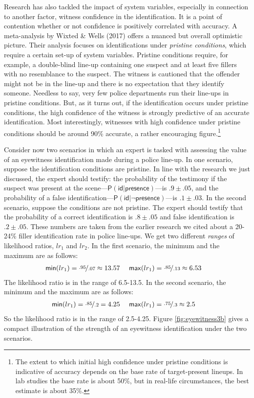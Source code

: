 \documentclass[
  10pt,
  dvipsnames,enabledeprecatedfontcommands]{scrartcl}
\newcommand{\raf}[1]{\todo[color=olive!40]{#1}}
\newcommand{\pr}[1]{\mathsf{P}(#1)}
\begin{document}
Research has also tackled the impact of system variables, especially in
connection to another factor, witness confidence in the identification.
It is a point of contention whether or not confidence is positively
correlated with accuracy. A meta-analysis by Wixted \& Wells (2017)
offers a nuanced but overall optimistic picture. Their analysis focuses
on identifications under \emph{pristine conditions}, which require a
certain set-up of system variables. Pristine conditions require, for
example, a double-blind line-up containing one suspect and at least five
fillers with no resemblance to the suspect. The witness is cautioned
that the offender might not be in the line-up and there is no
expectation that they identify someone. Needless to say, very few police
departments run their line-ups in pristine conditions. But, as it turns
out, if the identification occurs under pristine conditions, the high
confidence of the witness is strongly predictive of an accurate
identification. Most interestingly, witnesses with high confidence under
pristine conditions should be around 90\% accurate, a rather encouraging
figure.\footnote{The extent to which initial high confidence under
  pristine conditions is indicative of accuracy depends on the base rate
  of target-present lineups. In lab studies the base rate is about 50\%,
  but in real-life circumstances, the best estimate is about 35\%.}

Consider now two scenarios in which an expert is tasked with assessing
the value of an eyewitness identification made during a police line-up.
In one scenario, suppose the identification conditions are pristine. In
line with the research we just discussed, the expert should testify: the
probability of the testimony if the suspect was present at the
scene---\(\pr{\textsf{id} \vert \textsf{presence}}\)---is
\(.9 \pm .05\), and the probability of a false
identification---\(\pr{\textsf{id} \vert \neg \textsf{presence}}\)---is
\(.1\pm .03\). In the second scenario, suppose the conditions are not
pristine. The expert should testify that the probability of a correct
identification is \(.8 \pm .05\) and false identification is
\(.2 \pm .05\). These numbers are taken from the earlier research we
cited about a 20-24\% filler identification rate in police line-ups.
\raf{M: check and explain these numebers} We get two different
\emph{ranges} of likelihood ratios, \(lr_1\) and \(lr_2\). In the first
scenario, the minimum and the maximum are as follows: \begin{align*}
\mathsf{min}(lr_1) = \nicefrac{.95}{.07} \approx 13.57  & \,\,\,\,\,\,\,\,  \mathsf{max}(lr_1) = \nicefrac{.85}{.13} \approx 6.53  
\end{align*} \noindent The likelihood ratio is in the range of 6.5-13.5.
In the second scenario, the minimum and the maximum are as follows:
\begin{align*}
\mathsf{min}(lr_1) = \nicefrac{.85}{.2} =  4.25 &  \,\,\,\,\,\,\,\,   \mathsf{max}(lr_1) = \nicefrac{.75}{.3} \approx 2.5  
\end{align*} \noindent So the likelihood ratio is in the range of
2.5-4.25. Figure \ref{fig:eyewitness3b} gives a compact illustration of
the strength of an eyewitness identification under the two scenarios.
\end{document}
